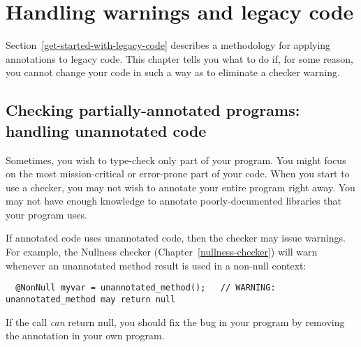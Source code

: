 \htmlhr
\chapter{Handling warnings and legacy code\label{warnings-and-legacy}}

Section~\ref{get-started-with-legacy-code} describes a methodology for
applying annotations to legacy code.  This chapter tells you what to do if,
for some reason, you cannot change your code in such a way as to eliminate
a checker warning.


\section{Checking partially-annotated programs:  handling unannotated code\label{unannotated-code}}

Sometimes, you wish to type-check only part of your program.
You might focus on the most mission-critical or error-prone part of your
code.  When you start to use a checker, you may not wish to annotate
your entire program right away.
You may not have
enough knowledge to annotate poorly-documented libraries that your program uses.

If annotated code uses unannotated code, then the checker may issue
warnings.  For example, the Nullness checker (Chapter~\ref{nullness-checker}) will
warn whenever an unannotated method result is used in a non-null context:

\begin{Verbatim}
  @NonNull myvar = unannotated_method();   // WARNING: unannotated_method may return null
\end{Verbatim}

If the call \emph{can} return null, you should fix the bug in your program by
removing the  annotation in your own program.

